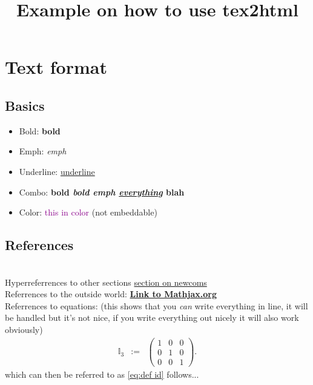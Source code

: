 

\newcommand{\bcite}[1]{\href{#1}{\textbf{Link}.}}
\newcommand{\RR}{$\mathbb R$}
\newcommand{\eqa}[1]{\begin{eqnarray}#1\end{eqnarray}}

\title{Example on how to use tex2html}


\maketitle

\section{Text format}
\subsection{Basics}
\begin{itemize}
    \item Bold: \textbf{bold}
    \item Emph: \emph{emph}
    \item Underline: \underline{underline}
    \item Combo: \textbf{bold \emph{bold emph \underline{everything}} blah}
    \item Color: \textcolor{DarkMagenta}{this in color} (not embeddable)
\end{itemize}

\subsection{References}\\
Hyperreferrences to other sections \hyperref[sec:newcom]{section on newcoms}\\
Referrences to the outside world: \href{http://www.mathjax.org}{\textbf{Link to Mathjax.org}}\\
Referrences to equations: (this shows that you \emph{can} write everything in line, it will be handled but it's not nice, if you write everything out nicely it will also work obviously)
\eqa{ \mathbb I_3 &:=& \left(\begin{array}{ccc}1&0&0\\0&1&0\\0&0&1 \end{array}\right).\label{eq:def id}}
which can then be referred to as \eqref{eq:def id} follows...\\

